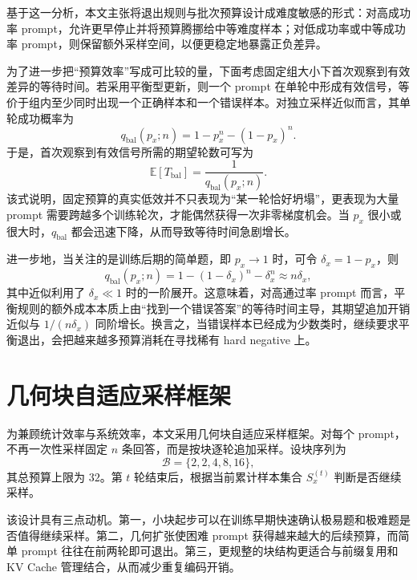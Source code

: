 基于这一分析，本文主张将退出规则与批次预算设计成难度敏感的形式：对高成功率 prompt，允许更早停止并将预算腾挪给中等难度样本；对低成功率或中等成功率 prompt，则保留额外采样空间，以便更稳定地暴露正负差异。

为了进一步把“预算效率”写成可比较的量，下面考虑固定组大小下首次观察到有效差异的等待时间。若采用平衡型更新，则一个 prompt 在单轮中形成有效信号，等价于组内至少同时出现一个正确样本和一个错误样本。对独立采样近似而言，其单轮成功概率为
\begin{equation}
    q_{\mathrm{bal}}(p_x;n)=1-p_x^n-(1-p_x)^n.
\end{equation}
于是，首次观察到有效信号所需的期望轮数可写为
\begin{equation}
    \mathbb{E}[T_{\mathrm{bal}}]=\frac{1}{q_{\mathrm{bal}}(p_x;n)}.
\end{equation}
该式说明，固定预算的真实低效并不只表现为“某一轮恰好坍塌”，更表现为大量 prompt 需要跨越多个训练轮次，才能偶然获得一次非零梯度机会。当 $p_x$ 很小或很大时，$q_{\mathrm{bal}}$ 都会迅速下降，从而导致等待时间急剧增长。

进一步地，当关注的是训练后期的简单题，即 $p_x\rightarrow 1$ 时，可令 $\delta_x=1-p_x$，则
\begin{equation}
    q_{\mathrm{bal}}(p_x;n)=1-(1-\delta_x)^n-\delta_x^n\approx n\delta_x,
\end{equation}
其中近似利用了 $\delta_x\ll 1$ 时的一阶展开。这意味着，对高通过率 prompt 而言，平衡规则的额外成本本质上由“找到一个错误答案”的等待时间主导，其期望追加开销近似与 $1/(n\delta_x)$ 同阶增长。换言之，当错误样本已经成为少数类时，继续要求平衡退出，会把越来越多预算消耗在寻找稀有 hard negative 上。
\section{几何块自适应采样框架}

为兼顾统计效率与系统效率，本文采用几何块自适应采样框架。对每个 prompt，不再一次性采样固定 $n$ 条回答，而是按块逐轮追加采样。设块序列为
\begin{equation}
    \mathcal{B}=\{2,2,4,8,16\},
\end{equation}
其总预算上限为 $32$。第 $t$ 轮结束后，根据当前累计样本集合 $S_x^{(t)}$ 判断是否继续采样。

该设计具有三点动机。第一，小块起步可以在训练早期快速确认极易题和极难题是否值得继续采样。第二，几何扩张使困难 prompt 获得越来越大的后续预算，而简单 prompt 往往在前两轮即可退出。第三，更规整的块结构更适合与前缀复用和 KV Cache 管理结合，从而减少重复编码开销。

